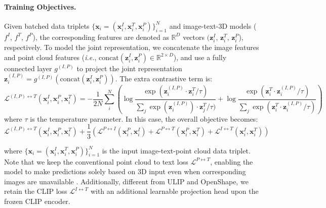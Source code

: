 \documentclass{article} \usepackage{iclr2024_conference,times}
\def\ie{\textit{i.e.}}
\begin{document}
\paragraph{Training Objectives.} 
Given batched data triplets $\{\bm{x}_i=(\bm{x}_{i}^{I}, \bm{x}_{i}^{T}, \bm{x}_{i}^{P})\}_{i=1}^{N}$ and image-text-3D models ($f^I$, $f^T$, $f^P$), the corresponding features are denoted as $\mathbb{R}^{D}$ vectors $(\bm{z}_{i}^{I}$, $\bm{z}_{i}^{T}$, $\bm{z}_{i}^{P}$), respectively. 
To model the joint representation, we concatenate the image features and point cloud features (\ie, $\mathrm{concat}(\bm{z}_{i}^{I}, \bm{z}_{i}^{P}) \in \mathbb{R}^{2 \times D}$), and use a fully connected layer $g^{(I, P)}$ to project the joint representation $\bm{z}_i^{(I, P)} = g^{(I, P)}(\mathrm{concat}(\bm{z}_{i}^{I}, \bm{z}_{i}^{P}))$. The extra contrastive term is:
\begin{equation}
\label{eq:modal_joint_loss}
\mathcal{L}^{(I,P) \leftrightarrow T}(\bm{x}_{i}^{I}, \bm{x}_{i}^{P},\bm{x}_{i}^{T}) = -\frac{1}{2N} \sum_i^N(
\log\frac{\exp(\bm{z}_i^{(I,P)}\cdot \bm{z}_i^T/\tau)}{\sum_j\exp(\bm{z}_i^{(I,P)})\cdot \bm{z}_j^T/\tau)} +
\log\frac{\exp(\bm{z}_i^T\cdot \bm{z}_i^{(I,P)}/\tau)}{\sum_j \exp(\bm{z}_i^T\cdot \bm{z}_i^{(I,P)}/\tau)})
\end{equation}
where $\tau$ is the temperature parameter. In this case, the overall objective becomes:
\begin{equation}
\label{eq:total_loss}
\mathcal{L}^{(I,P) \leftrightarrow T}(\bm{x}_{i}^{I}, \bm{x}_{i}^{P},\bm{x}_{i}^{T}) +
\frac{1}{3}(\mathcal{L}^{P \leftrightarrow I}(\bm{x}_{i}^{P},\bm{x}_{i}^{I}) + 
\mathcal{L}^{P \leftrightarrow T}(\bm{x}_{i}^{P},\bm{x}_{i}^{T}) +
\mathcal{L}^{I \leftrightarrow T}(\bm{x}_{i}^{I},\bm{x}_{i}^{T}))
\end{equation}

where $\{\bm{x}_i=(\bm{x}_{i}^{I}, \bm{x}_{i}^{T}, \bm{x}_{i}^{P})\}_{i=1}^{N}$ is the input image-text-point cloud data triplet.
Note that we keep the conventional point cloud to text loss $\mathcal{L}^{P \leftrightarrow T}$, enabling the model to make predictions solely based on 3D input even when corresponding images are unavailable \citep{scanobjectnn,modelnet40}.
Additionally, different from ULIP and OpenShape, we retain the CLIP loss $\mathcal{L}^{I \leftrightarrow T}$ with an additional learnable projection head upon the frozen CLIP encoder.
\end{document}
